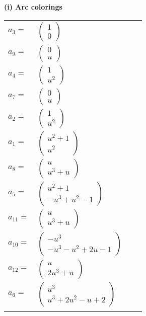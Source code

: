 \documentclass[1p]{elsarticle_modified}
\theoremstyle{definition}
\begin{document}
\flushleft \textbf{(i) Arc colorings}\\
\begin{tabular}{m{7pt} m{180pt} m{7pt} m{180pt} }
\flushright $a_{3}=$&$\begin{pmatrix}1\\0\end{pmatrix}$ \\
\flushright $a_{9}=$&$\begin{pmatrix}0\\u\end{pmatrix}$ \\
\flushright $a_{4}=$&$\begin{pmatrix}1\\u^2\end{pmatrix}$ \\
\flushright $a_{7}=$&$\begin{pmatrix}0\\u\end{pmatrix}$ \\
\flushright $a_{2}=$&$\begin{pmatrix}1\\u^2\end{pmatrix}$ \\
\flushright $a_{1}=$&$\begin{pmatrix}u^2+1\\u^2\end{pmatrix}$ \\
\flushright $a_{8}=$&$\begin{pmatrix}u\\u^3+u\end{pmatrix}$ \\
\flushright $a_{5}=$&$\begin{pmatrix}u^2+1\\- u^3+u^2-1\end{pmatrix}$ \\
\flushright $a_{11}=$&$\begin{pmatrix}u\\u^3+u\end{pmatrix}$ \\
\flushright $a_{10}=$&$\begin{pmatrix}- u^3\\- u^3- u^2+2 u-1\end{pmatrix}$ \\
\flushright $a_{12}=$&$\begin{pmatrix}u\\2 u^3+u\end{pmatrix}$ \\
\flushright $a_{6}=$&$\begin{pmatrix}u^3\\u^3+2 u^2- u+2\end{pmatrix}$\\&\end{tabular}
\end{document}
